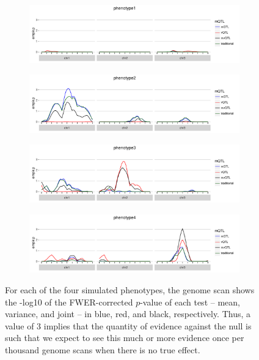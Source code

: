 \documentclass[9pt,twocolumn,twoside]{gsag3jnl}
\begin{document}
\begin{figure}[ht!]
    \begin{subfigure}{0.5\textwidth}
        \includegraphics[width=\textwidth]{images/empir_p_scan_phenotype1.pdf}
    \end{subfigure}

    \begin{subfigure}[b]{0.5\textwidth}
        \includegraphics[width=\textwidth]{images/empir_p_scan_phenotype2.pdf}
    \end{subfigure}

    \begin{subfigure}[b]{0.5\textwidth}
        \includegraphics[width=\textwidth]{images/empir_p_scan_phenotype3.pdf}
    \end{subfigure}
    
    \begin{subfigure}[b]{0.5\textwidth}
        \includegraphics[width=\textwidth]{images/empir_p_scan_phenotype4.pdf}
    \end{subfigure}
    
    \caption{For each of the four simulated phenotypes, the genome scan shows the -log10 of the FWER-corrected $p$-value of each test -- mean, variance, and joint -- in blue, red, and black, respectively. Thus, a value of 3 implies that the quantity of evidence against the null is such that we expect to see this much or more evidence once per thousand genome scans when there is no true effect. \label{fig:empir_p_scans}}
\end{figure}
\end{document}
